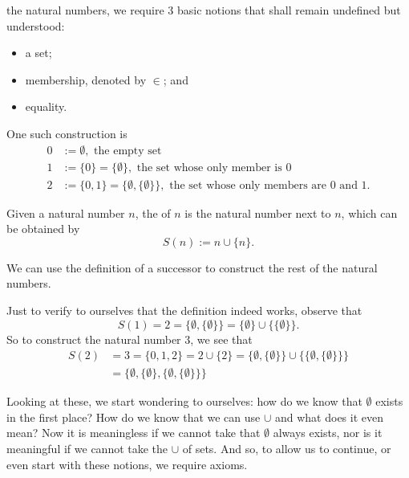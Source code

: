 \documentclass[notoc,notitlepage]{tufte-book}
\begin{document}
 the natural numbers, we require 3 basic notions that shall remain undefined but understood:
\begin{itemize}
  \item a set;
  \item membership, denoted by $\in$; and
  \item equality.
\end{itemize}

One such construction is
\begin{align*}
  0 &:= \emptyset, \text{ the empty set } \\
  1 &:= \{0\} = \{ \emptyset \}, \text{ the set whose only member is } 0 \\
  2 &:= \{0, 1\} = \{ \emptyset, \{ \emptyset \} \}, \text{ the set whose only members are } 0 \text{ and } 1.
\end{align*}

\begin{defn}[Successor]
\label{defn:successor}
  Given a natural number $n$, the  of $n$ is the natural number next to $n$, which can be obtained by
  \begin{equation*}
    S(n) := n \cup \{ n \}.
  \end{equation*}
\end{defn}

We can use the definition of a successor to construct the rest of the natural numbers.

\begin{eg}
  Just to verify to ourselves that the definition indeed works, observe that
  \begin{equation*}
    S(1) = 2 = \{ \emptyset, \{ \emptyset \} \} = \{ \emptyset \} \cup \{ \{ \emptyset \} \}.
  \end{equation*}
  So to construct the natural number $3$, we see that
  \begin{align*}
    S(2) &= 3 = \{ 0, 1, 2 \} = 2 \cup \{ 2 \} = \{ \emptyset, \{ \emptyset \} \} \cup \{ \{ \emptyset, \{ \emptyset \} \} \} \\
         &= \{ \emptyset, \{ \emptyset \}, \{ \emptyset, \{ \emptyset \} \} \}
  \end{align*}
\end{eg}

Looking at these, we start wondering to ourselves: how do we know that $\emptyset$ exists in the first place? How do we know that we can use $\cup$ and what does it even mean? Now it is meaningless if we cannot take that $\emptyset$ always exists, nor is it meaningful if we cannot take the $\cup$ of sets. And so, to allow us to continue, or even start with these notions, we require axioms.
\end{document}
